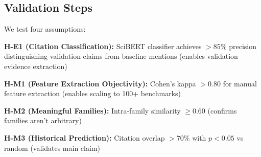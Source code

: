 \subsection{Validation Steps}

We test four assumptions:

\textbf{H-E1 (Citation Classification):} SciBERT classifier achieves $>85\%$ precision distinguishing validation claims from baseline mentions (enables validation evidence extraction)

\textbf{H-M1 (Feature Extraction Objectivity):} Cohen's kappa $>0.80$ for manual feature extraction (enables scaling to 100+ benchmarks)

\textbf{H-M2 (Meaningful Families):} Intra-family similarity $\geq 0.60$ (confirms families aren't arbitrary)

\textbf{H-M3 (Historical Prediction):} Citation overlap $>70\%$ with $p<0.05$ vs random (validates main claim)
